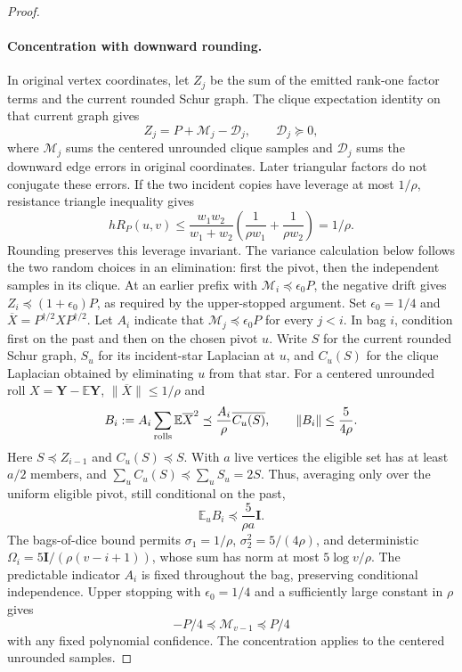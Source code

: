 \documentclass[11pt]{article}
\theoremstyle{remark}
\newcommand{\II}{\mathbf I}
\newcommand{\YY}{\mathbf Y}
\newcommand{\Ex}{\mathbb E}
\newcommand{\norm}[1]{\lVert#1\rVert}
\begin{document}
\begin{proof}
\paragraph{Concentration with downward rounding.}
In original vertex coordinates, let $Z_j$ be the sum of the emitted rank-one
factor terms and the current rounded Schur graph.
The clique expectation identity on that current graph gives
\[
 Z_j=P+\mathcal M_j-\mathcal D_j,\qquad
 \mathcal D_j\succeq0,
\]
where $\mathcal M_j$ sums the centered unrounded clique samples and $\mathcal
D_j$ sums the downward edge errors in original coordinates.
Later triangular factors do not conjugate these errors.
If the two incident copies have leverage at most $1/\rho$, resistance triangle
inequality gives
\[
 h R_P(u,v)\le
 \frac{w_1w_2}{w_1+w_2}
 \left(\frac1{\rho w_1}+\frac1{\rho w_2}\right)=1/\rho.
\]
Rounding preserves this leverage invariant.
The variance calculation below follows the two random choices in an elimination:
first the pivot, then the independent samples in its clique.
At an earlier prefix with $\mathcal M_i\preceq\epsilon_0P$, the negative drift
gives $Z_i\preceq(1+\epsilon_0)P$, as required by the upper-stopped argument.
Set $\epsilon_0=1/4$ and $\overline X=P^{\dagger/2}XP^{\dagger/2}$.
Let $A_i$ indicate that $\mathcal M_j\preceq\epsilon_0P$ for every $j<i$.
In bag $i$, condition first on the past and then on the chosen pivot $u$.
Write $S$ for the current rounded Schur graph, $S_u$ for its incident-star
Laplacian at $u$, and $C_u(S)$ for the clique Laplacian obtained by eliminating
$u$ from that star.
For a centered unrounded roll $X=\YY-\Ex \YY$, $\norm{\overline X}\le1/\rho$ and
\[
 B_i:=A_i\sum_{\rm rolls}\Ex\overline X^2
       \preceq \frac{A_i}{\rho}\overline{C_u(S)},
 \qquad \norm{B_i}\le\frac5{4\rho}.
\]
Here $S\preceq Z_{i-1}$ and $C_u(S)\preceq S$.
With $a$ live vertices the eligible set has at least $a/2$ members, and $\sum_u
C_u(S)\preceq\sum_u S_u=2S$.
Thus, averaging only over the uniform eligible pivot, still conditional on the
past,
\[
 \Ex_u B_i\preceq\frac5{\rho a}\II.
\]
The bags-of-dice bound \cite[Theorems~4.3 and~4.5]{KS16:conf} permits
$\sigma_1=1/\rho$, $\sigma_2^2=5/(4\rho)$, and deterministic
$\Omega_i=5\II/(\rho(v-i+1))$, whose sum has norm at most $5\log v/\rho$.
The predictable indicator $A_i$ is fixed throughout the bag, preserving
conditional independence.
Upper stopping with $\epsilon_0=1/4$ and a sufficiently large constant in $\rho$
gives
\[
 -P/4\preceq\mathcal M_{v-1}\preceq P/4
\]
with any fixed polynomial confidence.
The concentration applies to the centered unrounded samples.


\end{proof}
\end{document}
